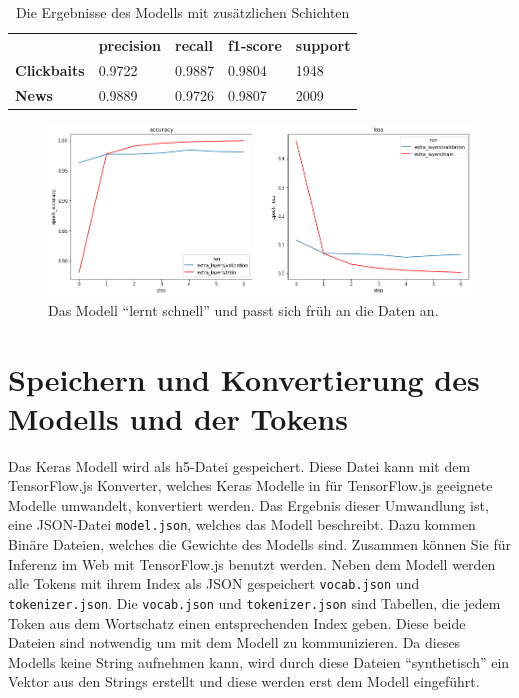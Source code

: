 \begin{table}[h]
    \caption{Die Ergebnisse des Modells mit zusätzlichen Schichten}
    \label{eval2}
    \renewcommand{\arraystretch}{1.2}
    \centering
    \sffamily
    \begin{footnotesize}
        \begin{tabular}{l l l l l}
            \toprule
                           & \textbf{precision} & \textbf{recall} & \textbf{f1-score} & \textbf{support} \\
            \textbf{Clickbaits} & 0.9722                  & 0.9887                 & 0.9804                & 1948          \\
            \textbf{News}  & 0.9889                 & 0.9726                & 0.9807               & 2009                     \\
            \bottomrule
        \end{tabular}
    \end{footnotesize}
    \rmfamily
\end{table}


\begin{figure}[H]
    \centering
    \includegraphics[width=15cm]{kapitel5/complexmodel_.png}
    \caption[Auswirkung der zusätzlichen Schichten]{Das Modell \enquote{lernt schnell} und passt sich früh an die Daten an.}
    \label{extrlayerspic}
\end{figure}

\section{Speichern und Konvertierung des Modells und der Tokens}
Das Keras Modell wird als h5-Datei gespeichert. Diese Datei kann mit dem TensorFlow.js Konverter, welches Keras Modelle in für TensorFlow.js geeignete Modelle umwandelt, konvertiert werden. Das Ergebnis dieser Umwandlung ist, eine JSON-Datei \texttt{model.json}, welches das Modell beschreibt. Dazu kommen Binäre Dateien, welches die Gewichte des Modells sind. Zusammen können Sie für Inferenz im Web mit TensorFlow.js benutzt werden. Neben dem Modell werden alle Tokens mit ihrem Index als JSON gespeichert \texttt{vocab.json} und \texttt{tokenizer.json}. Die \texttt{vocab.json} und \texttt{tokenizer.json} sind Tabellen, die jedem Token aus dem Wortschatz einen entsprechenden Index geben. Diese beide Dateien sind notwendig um mit dem Modell zu kommunizieren. Da dieses Modells keine String aufnehmen kann, wird durch diese Dateien \enquote{synthetisch} ein Vektor aus den Strings erstellt und diese werden erst dem Modell eingeführt.